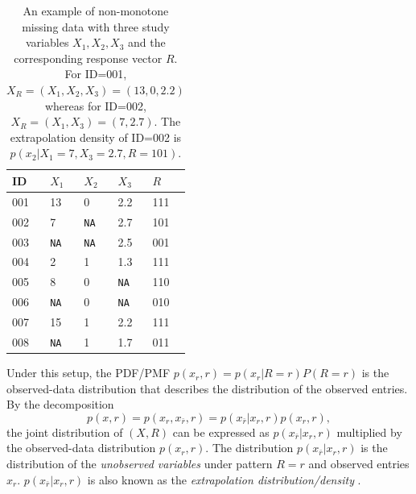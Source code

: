 \documentclass[aos, preprint]{imsart}
\theoremstyle{plain}
\theoremstyle{definition}
\newcommand{\R}{\mbox{$\mathbb{R}$}}
\begin{document}
\begin{table}
\center
\begin{tabular}{lllll}
\toprule
ID  & $X_1$ & $X_2$ & $X_3$ & $R$ \\
\midrule
001 & 13    & 0     & 2.2   & 111 \\
002 & 7     & \texttt{NA}    & 2.7   & 101 \\
003 & \texttt{NA}    & \texttt{NA}    & 2.5   & 001 \\
004 & 2     & 1     & 1.3   & 111 \\
005 & 8     & 0     & \texttt{NA}    & 110 \\
006 & \texttt{NA}    & 0     & \texttt{NA}    & 010 \\
007 & 15    & 1     & 2.2   & 111 \\
008 & \texttt{NA}    & 1     & 1.7   & 011\\
\bottomrule
\end{tabular}
\caption{An example of non-monotone missing data with three study variables $X_1,X_2,X_3$
and the corresponding response vector $R$.
For ID=001, $X_R = (X_1,X_2,X_3) =  (13,0,2.2)$ whereas for ID=002, $X_R = (X_1, X_3) = (7,2.7)$.
The extrapolation density of ID=002 is $p(x_2|X_1=7,X_3=2.7, R=101)$.
}
\label{tab::non}
\end{table}



Under this setup, the PDF/PMF $p(x_r,r) = p(x_r|R=r) P(R=r)$
is the observed-data distribution that describes the distribution of the observed entries.
By the decomposition
$$
p(x,r) = p(x_r, x_{\bar r}, r) = p(x_{\bar r}|x_r, r) p(x_r,r),
$$
the joint distribution of $(X,R)$ can be expressed as 
$p(x_{\bar r}|x_r, r) $ multiplied by the observed-data distribution $p(x_r,r)$.
The distribution 
$
p(x_{\bar r}|x_r,r)
$
is the distribution of the \emph{unobserved variables} under pattern $R=r$ and observed entries $x_r$.
$p(x_{\bar r}|x_r,r)$ is also known as the \emph{extrapolation distribution/density} \citep{little1993pattern}. 


\end{document}
